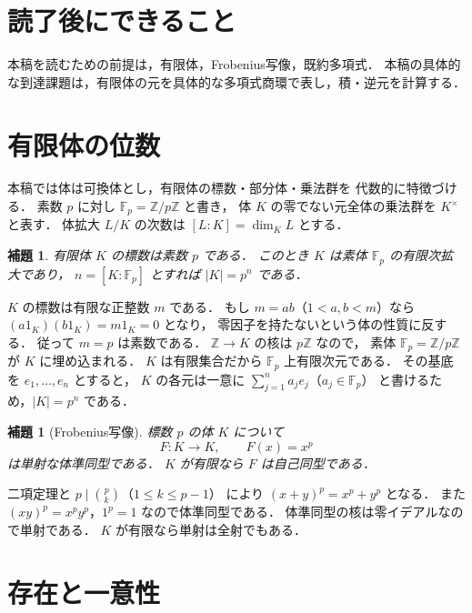 \documentclass[a5paper,10pt,onecolumn]{jsarticle}
\makeatletter
\theoremstyle{mathnotetheorem}
\newtheorem{lemma}[theorem]{補題}
\renewcommand{\proofname}{証明}
\renewenvironment{proof}[1][\proofname]{%
  \par\pushQED{\qed}\normalfont\topsep4\p@\@plus2\p@\relax
  \trivlist\item[\hskip\labelsep\bfseries #1]\ignorespaces
}{\popQED\endtrivlist\@endpefalse}
\makeatother
\begin{document}
\section*{読了後にできること}
本稿を読むための前提は，有限体，Frobenius写像，既約多項式．
本稿の具体的な到達課題は，有限体の元を具体的な多項式商環で表し，積・逆元を計算する．

\section{有限体の位数}

本稿では体は可換体とし，有限体の標数・部分体・乗法群を
代数的に特徴づける．
素数 $p$ に対し $\mathbb F_p=\mathbb Z/p\mathbb Z$ と書き，
体 $K$ の零でない元全体の乗法群を $K^\times$ と表す．
体拡大 $L/K$ の次数は $[L:K]=\dim_K L$ とする．

\begin{lemma}\label{lem:char}
有限体 $K$ の標数は素数 $p$ である．
このとき $K$ は素体 $\mathbb F_p$ の有限次拡大であり，
$n=[K:\mathbb F_p]$ とすれば
$|K|=p^n$ である．
\end{lemma}
\begin{proof}
$K$ の標数は有限な正整数 $m$ である．
もし $m=ab$（$1<a,b<m$）なら
$(a1_K)(b1_K)=m1_K=0$ となり，
零因子を持たないという体の性質に反する．
従って $m=p$ は素数である．
$\mathbb Z\to K$ の核は $p\mathbb Z$ なので，
素体 $\mathbb F_p=\mathbb Z/p\mathbb Z$ が $K$ に埋め込まれる．
$K$ は有限集合だから $\mathbb F_p$ 上有限次元である．
その基底を $e_1,\dots,e_n$ とすると，
$K$ の各元は一意に
$\sum_{j=1}^na_je_j$（$a_j\in\mathbb F_p$）
と書けるため，$|K|=p^n$ である．
\end{proof}

\begin{lemma}[Frobenius写像]\label{lem:frob}
標数 $p$ の体 $K$ について
\[
 F:K\to K,\qquad F(x)=x^p
\]
は単射な体準同型である．
$K$ が有限なら $F$ は自己同型である．
\end{lemma}
\begin{proof}
二項定理と
$p\mid{p\choose k}$（$1\le k\le p-1$）
により $(x+y)^p=x^p+y^p$ となる．
また $(xy)^p=x^py^p$，$1^p=1$ なので体準同型である．
体準同型の核は零イデアルなので単射である．
$K$ が有限なら単射は全射でもある．
\end{proof}

\section{存在と一意性}
\end{document}

